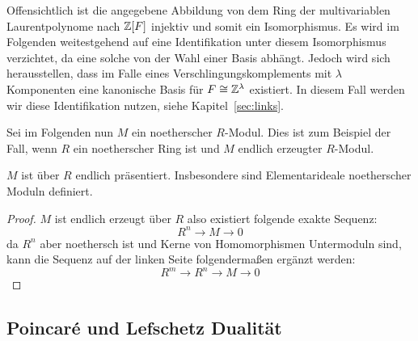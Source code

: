 \begin{bem}
	Offensichtlich ist die angegebene Abbildung von dem Ring der multivariablen Laurentpolynome nach $\mathbb{Z}[F]$ injektiv und somit ein Isomorphismus. Es wird im Folgenden weitestgehend auf eine Identifikation unter diesem Isomorphismus verzichtet, da eine solche von der Wahl einer Basis abhängt. Jedoch wird sich herausstellen, dass im Falle eines Verschlingungskomplements mit $\lambda$ Komponenten eine kanonische Basis für $F\cong \mathbb{Z}^\lambda$ existiert. In diesem Fall werden wir diese Identifikation nutzen, siehe Kapitel~\ref{sec:links}.
\end{bem}


Sei im Folgenden nun $M$ ein noetherscher $R$-Modul. Dies ist zum Beispiel der Fall, wenn $R$ ein noetherscher Ring ist und $M$ endlich erzeugter $R$-Modul.
\begin{lem}
	$M$ ist über $R$ endlich präsentiert. Insbesondere sind Elementarideale noetherscher Moduln definiert.
\end{lem}
\begin{proof}
	$M$ ist endlich erzeugt über $R$ also existiert folgende exakte Sequenz:
	\[
		R^n \to M \to 0
	\]
	da $R^n$ aber noethersch ist und Kerne von Homomorphismen Untermoduln sind, kann die Sequenz auf der linken Seite folgendermaßen ergänzt werden:
	\[
		R^m \to R^n \to M \to 0
	\]
\end{proof}


\subsection{Poincaré und Lefschetz Dualität}
\label{sec:poinc}

